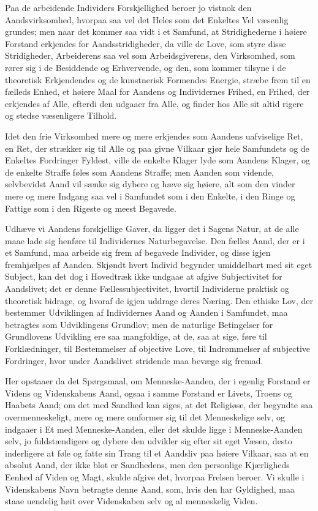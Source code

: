 \documentclass[12pt]{book}
\newcommand{\apage}[1]{\marginnote{\footnotesize\textit{[#1]}}}
\begin{document}
Paa de arbeidende Individers Forskjellighed beroer jo vistnok den
Aandsvirksomhed, hvorpaa saa vel det Heles som det Enkeltes Vel væsenlig
grundes; men naar det kommer saa vidt i et Samfund, at Stridighederne i høiere
Forstand erkjendes for \apage{268} Aandsstridigheder, da ville de Love, som styre disse
Stridigheder, Arbeiderens saa vel som Arbeidsgiverens, den Virksomhed, som
rører sig i de Besiddende og Erhvervende, og den, som kommer tilsyne i de
theoretisk Erkjendendes og de kunstnerisk Formendes Energie, stræbe frem til
en fælleds Enhed, et høiere Maal for Aandens og Individernes Frihed, en Frihed,
der erkjendes af Alle, efterdi den udgaaer fra Alle, og finder hos Alle sit
altid rigere og stedse væsenligere Tilhold.

Idet den frie Virksomhed mere og mere erkjendes som Aandens uafviselige Ret,
en Ret, der strækker sig til Alle og paa givne Vilkaar gjør hele Samfundets og
de Enkeltes Fordringer Fyldest, ville de enkelte Klager lyde som Aandens
Klager, og de enkelte Straffe føles som Aandens Straffe; men Aanden som
vidende, selvbevidst Aand vil sænke sig dybere og hæve sig høiere, alt som den
vinder mere og mere Indgang saa vel i Samfundet som i den Enkelte, i den Ringe
og Fattige som i den Rigeste og meest Begavede.

Udhæve vi Aandens forskjellige Gaver, da ligger det i Sagens Natur, at de alle
maae lade sig henføre til Individernes Naturbegavelse. Den fælles Aand, der er
i et Samfund, maa arbeide sig frem af begavede Individer, og disse igjen
fremhjælpes af Aanden. Skjøndt hvert Individ begynder umiddelbart med sit eget
Subject, kan det dog i Hovedtræk ikke undgaae at afgive Subjectivitet for
Aandslivet; det er denne Fællessubjectivitet, hvortil Individerne praktisk og
theoretisk bidrage, og hvoraf de igjen uddrage deres Næring. Den ethiske Lov,
der bestemmer Udviklingen af Individernes \apage{269} Aand og Aanden i Samfundet, maa
betragtes som Udviklingens Grundlov; men de naturlige Betingelser for
Grundlovens Udvikling ere saa mangfoldige, at de, saa at sige, føre til
Forklædninger, til Bestemmelser af objective Love, til Indrømmelser af
subjective Fordringer, hvor under Aandslivet stridende maa bevæge sig fremad.

Her opstaaer da det Spørgsmaal, om Menneske-Aanden, der i egenlig Forstand er
Videns og Videnskabens Aand, ogsaa i samme Forstand er Livets, Troens og
Haabets Aand; om det med Sandhed kan siges, at det Religiøse, der begyndte saa
overmenneskeligt, mere og mere omformer sig til det Menneskelige selv, og
indgaaer i Et med Menneske-Aanden, eller det skulde ligge i Menneske-Aanden
selv, jo fuldstændigere og dybere den udvikler sig efter sit eget Væsen, desto
inderligere at føle og fatte sin Trang til et Aandsliv paa høiere Vilkaar, saa
at en absolut Aand, der ikke blot er Sandhedens, men den personlige
Kjærligheds Eenhed af Viden og Magt, skulde afgive det, hvorpaa Frelsen
beroer. Vi skulle i Videnskabens Navn betragte denne Aand, som, hvis den har
Gyldighed, maa staae uendelig høit over Videnskaben selv og al menneskelig
Viden.
\end{document}

